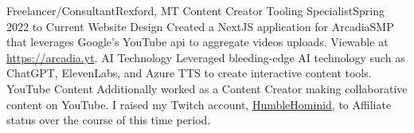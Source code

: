 

\experienceHeading
{Freelancer/Consultant}{Rexford, MT}
{Content Creator Tooling Specialist}{Spring 2022 to Current}
\experienceStart
	\experienceItem
		{Website Design}
		{Created a NextJS application for ArcadiaSMP that leverages Google's YouTube api to aggregate videos uploads. Viewable at \href{https://arcadia.yt}{https://arcadia.yt}.}
	\experienceItem
		{AI Technology}
		{Leveraged bleeding-edge AI technology such as ChatGPT, ElevenLabs, and Azure TTS to create interactive content tools.}
	\experienceItem
		{YouTube Content}
		{Additionally worked as a Content Creator making collaborative content on YouTube. I raised my Twitch account, \href{https://twitch.tv/HumbleHominid}{HumbleHominid}, to Affiliate status over the course of this time period.}
\experienceEnd